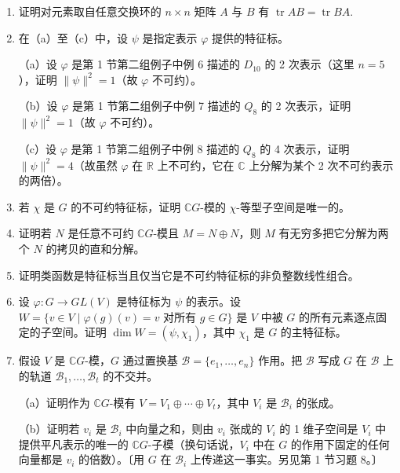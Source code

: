 \begin{enumerate}
\item 证明对元素取自任意交换环的 \(n \times n\) 矩阵 \(A\) 与 \(B\) 有 \(\operatorname{tr}AB = \operatorname{tr}BA\).

\item 在（a）至（c）中，设 \(\psi\) 是指定表示 \(\varphi\) 提供的特征标。

（a）设 \(\varphi\) 是第 1 节第二组例子中例 6 描述的 \(D_{10}\) 的 2 次表示（这里 \(n = 5\)），证明 \(\|\psi\|^2 = 1\)（故 \(\varphi\) 不可约）。

（b）设 \(\varphi\) 是第 1 节第二组例子中例 7 描述的 \(Q_8\) 的 2 次表示，证明 \(\|\psi\|^2 = 1\)（故 \(\varphi\) 不可约）。

（c）设 \(\varphi\) 是第 1 节第二组例子中例 8 描述的 \(Q_8\) 的 4 次表示，证明 \(\|\psi\|^2 = 4\)（故虽然 \(\varphi\) 在 \(\mathbb{R}\) 上不可约，它在 \(\mathbb{C}\) 上分解为某个 2 次不可约表示的两倍）。

\item 若 \(\chi\) 是 \(G\) 的不可约特征标，证明 \(\mathbb{C}G\)-模的 \(\chi\)-等型子空间是唯一的。

\item 证明若 \(N\) 是任意不可约 \(\mathbb{C}G\)-模且 \(M = N \oplus N\)，则 \(M\) 有无穷多把它分解为两个 \(N\) 的拷贝的直和分解。

\item 证明类函数是特征标当且仅当它是不可约特征标的非负整数线性组合。

\item 设 \(\varphi : G \to GL(V)\) 是特征标为 \(\psi\) 的表示。设 \(W = \{v \in V \mid \varphi(g)(v) = v \text{ 对所有 } g \in G\}\) 是 \(V\) 中被 \(G\) 的所有元素逐点固定的子空间。证明 \(\dim W = (\psi, \chi_1)\)，其中 \(\chi_1\) 是 \(G\) 的主特征标。

\item 假设 \(V\) 是 \(\mathbb{C}G\)-模，\(G\) 通过置换基 \(\mathcal{B} = \{e_1, \ldots, e_n\}\) 作用。把 \(\mathcal{B}\) 写成 \(G\) 在 \(\mathcal{B}\) 上的轨道 \(\mathcal{B}_1, \ldots, \mathcal{B}_t\) 的不交并。

（a）证明作为 \(\mathbb{C}G\)-模有 \(V = V_1 \oplus \cdots \oplus V_t\)，其中 \(V_i\) 是 \(\mathcal{B}_i\) 的张成。

（b）证明若 \(v_i\) 是 \(\mathcal{B}_i\) 中向量之和，则由 \(v_i\) 张成的 \(V_i\) 的 1 维子空间是 \(V_i\) 中提供平凡表示的唯一的 \(\mathbb{C}G\)-子模（换句话说，\(V_i\) 中在 \(G\) 的作用下固定的任何向量都是 \(v_i\) 的倍数）。〔用 \(G\) 在 \(\mathcal{B}_i\) 上传递这一事实。另见第 1 节习题 8。〕


\end{enumerate}
